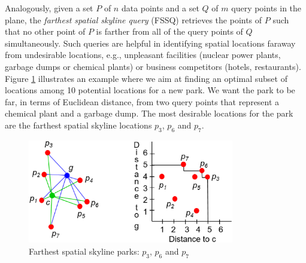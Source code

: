 \documentclass[11pt,onecolumn]{elsart3p}
\begin{document}
 \vspace{1em}
 Analogously, given a set $P$ of $n$ data points and a set $Q$ of $m$ query points in the plane, the {\it farthest spatial skyline query} (FSSQ) retrieves the points of $P$ such that no other point of $P$ is farther from all of the query points of $Q$ simultaneously. Such queries are helpful in identifying spatial locations faraway from undesirable locations, e.g., unpleasant facilities (nuclear power plants, garbage dumps or chemical plants) or business competitors (hotels, restaurants). Figure \ref{fig:FSSQExample1} illustrates an example where we aim at finding an optimal subset of locations among 10 potential locations for a new park. We want the park to be far, in terms of Euclidean distance, from two query points that represent a chemical plant and a garbage dump. The most desirable locations for the park are the farthest spatial skyline locations $p_3$, $p_6$ and $p_7$.

 \begin{figure}[!htp]
 \begin{center}
 \includegraphics[width=9cm]{img/FarthestSkylineExample.eps}
 \caption{Farthest spatial skyline parks: $p_3$, $p_6$ and $p_7$}
 \label{fig:FSSQExample1}
 \end{center}
 \end{figure}
\end{document}
